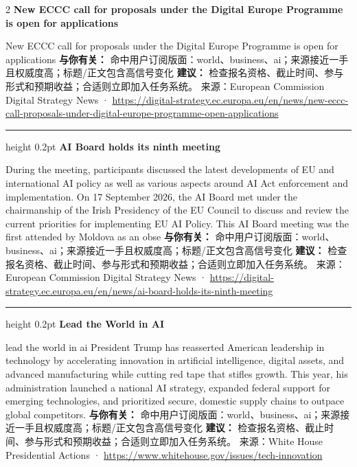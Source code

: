 \documentclass[10.5pt]{ctexart}
\begin{document}
\begin{multicols}{2}
{\large\bfseries New ECCC call for proposals under the Digital Europe Programme is open for applications}\par
New ECCC call for proposals under the Digital Europe Programme is open for applications
\textbf{与你有关：} 命中用户订阅版面：world、business、ai；来源接近一手且权威度高；标题/正文包含高信号变化
\textbf{建议：} 检查报名资格、截止时间、参与形式和预期收益；合适则立即加入任务系统。
{\footnotesize\color{ormuted} 来源：European Commission Digital Strategy News · \url{https://digital-strategy.ec.europa.eu/en/news/new-eccc-call-proposals-under-digital-europe-programme-open-applications}}
\vspace{2mm}
\hrule height 0.2pt
\vspace{2mm}
{\large\bfseries AI Board holds its ninth meeting}\par
During the meeting, participants discussed the latest developments of EU and international AI policy as well as various aspects around AI Act enforcement and implementation. On 17 September 2026, the AI Board met under the chairmanship of the Irish Presidency of the EU Council to discuss and review the current priorities for implementing EU AI Policy. This AI Board meeting was the first attended by Moldova as an obse
\textbf{与你有关：} 命中用户订阅版面：world、business、ai；来源接近一手且权威度高；标题/正文包含高信号变化
\textbf{建议：} 检查报名资格、截止时间、参与形式和预期收益；合适则立即加入任务系统。
{\footnotesize\color{ormuted} 来源：European Commission Digital Strategy News · \url{https://digital-strategy.ec.europa.eu/en/news/ai-board-holds-its-ninth-meeting}}
\vspace{2mm}
\hrule height 0.2pt
\vspace{2mm}
{\large\bfseries Lead the World in AI}\par
lead the world in ai President Trump has reasserted American leadership in technology by accelerating innovation in artificial intelligence, digital assets, and advanced manufacturing while cutting red tape that stifles growth. This year, his administration launched a national AI strategy, expanded federal support for emerging technologies, and prioritized secure, domestic supply chains to outpace global competitors.
\textbf{与你有关：} 命中用户订阅版面：world、business、ai；来源接近一手且权威度高；标题/正文包含高信号变化
\textbf{建议：} 检查报名资格、截止时间、参与形式和预期收益；合适则立即加入任务系统。
{\footnotesize\color{ormuted} 来源：White House Presidential Actions · \url{https://www.whitehouse.gov/issues/tech-innovation}}

\end{multicols}
\end{document}
